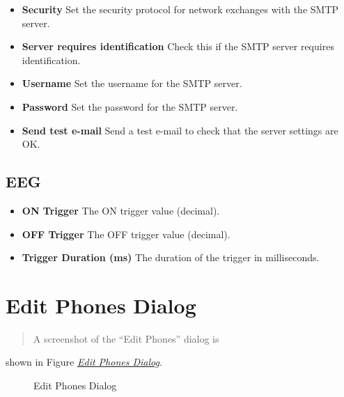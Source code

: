 \documentclass[a4paper,12pt,english]{sphinxmanual}
\begin{document}
\begin{itemize}
\item {} 
\textbf{Security} Set the security protocol for network exchanges with the
SMTP server.

\item {} 
\textbf{Server requires identification} Check this if the SMTP server
requires identification.

\item {} 
\textbf{Username} Set the username for the SMTP server.

\item {} 
\textbf{Password} Set the password for the SMTP server.

\item {} 
\textbf{Send test e-mail} Send a test e-mail to check that the server
settings are OK.

\end{itemize}


\subsection{EEG}
\label{graphical_user_interface:sec-edit-pref-dia-eeg}\label{graphical_user_interface:eeg}\begin{itemize}
\item {} 
\textbf{ON Trigger} The ON trigger value (decimal).

\item {} 
\textbf{OFF Trigger} The OFF trigger value (decimal).

\item {} 
\textbf{Trigger Duration (ms)} The duration of the trigger in
milliseconds.

\end{itemize}


\section{Edit Phones Dialog}
\label{graphical_user_interface:sec-edit-phones-dia}\label{graphical_user_interface:edit-phones-dialog}\begin{quote}

A screenshot of the “Edit Phones” dialog is
\end{quote}

shown in Figure {\hyperref[graphical_user_interface:fig-phones-database]{\emph{Edit Phones Dialog}}}.
\begin{figure}[htbp]
\centering
\capstart

\caption{Edit Phones Dialog}\label{graphical_user_interface:fig-phones-database}\end{figure}
\end{document}
